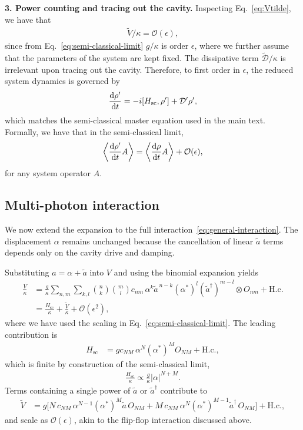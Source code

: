 \documentclass[aps,twocolumn,10pt,prl,floatfix,nofootinbib, superscriptaddress]{revtex4-2}
\begin{document}
\textbf{3. Power counting and tracing out the cavity.} Inspecting Eq.~\eqref{eq:Vtilde}, we have that
\begin{align}
\tilde{V}/\kappa = \mathcal{O}(\epsilon),
\end{align}
since from Eq.~\eqref{eq:semi-classical-limit} $g/\kappa$ is order $\epsilon$, where we further  assume that the parameters of the system are kept fixed. The dissipative term $\tilde{\mathcal{D}}/\kappa$ is irrelevant upon tracing out the cavity.
Therefore, to first order in $\epsilon$, the reduced system dynamics is governed by
\begin{align}
\dv{\rho'}{t}
= -i[H_\text{sc},\rho'] + \mathcal{D}'\rho',
\end{align}
which matches the semi-classical master equation used in the main text. Formally, we have that in the semi-classical limit,
\begin{align}
    \expval{\dv{\rho'}{t} A} = \expval{\dv{\rho}{t} A} + \mathcal{O}(\epsilon),
\end{align}
for any system operator $A$.

\subsection{Multi-photon interaction}

We now extend the expansion to the full interaction~\eqref{eq:general-interaction}.
The displacement $\alpha$ remains unchanged because the cancellation of linear $\tilde{a}$ terms depends only on the cavity drive and damping.

Substituting $a=\alpha+\tilde{a}$ into $V$ and using the binomial expansion yields
\begin{align}
\frac{V}{\kappa}
&= \frac{g}{\kappa}
\sum_{n,m}\sum_{k,l}
\binom{n}{k}\binom{m}{l}
c_{nm}\,
\alpha^{k}\tilde{a}^{\,n-k}
(\alpha^*)^{l}(\tilde{a}^\dagger)^{m-l}
\otimes O_{nm}
+ \text{H.c.} \\
&= \frac{H_\text{sc}}{\kappa}
+ \frac{\tilde{V}}{\kappa}
+ \mathcal{O}(\epsilon^2),
\end{align}
where we have used the scaling in Eq.~\eqref{eq:semi-classical-limit}.
The leading contribution is
\begin{align}
H_\text{sc}
&= g
c_{NM}\,\alpha^{N}(\alpha^*)^{M} O_{NM}
+ \text{H.c.},
\end{align}
which is finite by construction of the semi-classical limit,
\begin{align}
\frac{H_\text{sc}}{\kappa} \propto \frac{g}{\kappa} |\alpha|^{N+M}.
\end{align}
Terms containing a single power of $\tilde{a}$ or $\tilde{a}^\dagger$ contribute to
\begin{align}
\tilde{V}
&= g
\Big[
N\,c_{NM}\,\alpha^{N-1}(\alpha^*)^{M} \tilde{a}\, O_{NM}
+ M\,c_{NM}\,\alpha^{N}(\alpha^*)^{M-1} \tilde{a}^\dagger\, O_{NM}
\Big]
+ \text{H.c.},
\end{align}
and scale as $\mathcal{O}(\epsilon)$, akin to the flip-flop interaction discussed above.
\end{document}
